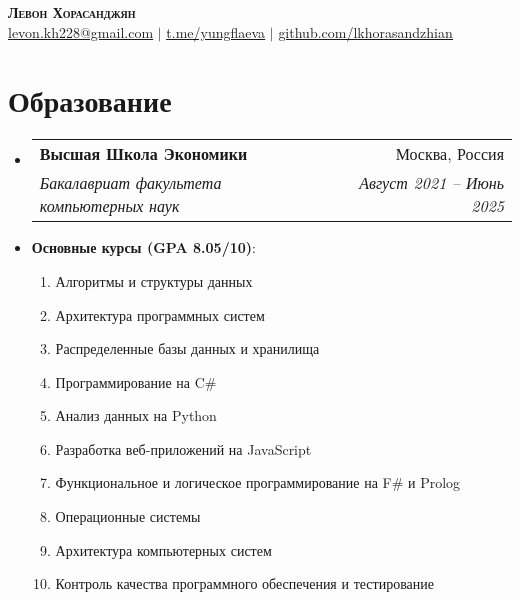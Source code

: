\documentclass[letterpaper,11pt]{article}
\makeatletter
\newcommand{\resumeItem}[1]{
  \item\small{
    {#1 \vspace{-4pt}}
  }
}
\newcommand{\resumeSubheading}[4]{
  \vspace{-2pt}\item
    \begin{tabular*}{0.97\textwidth}[t]{l@{\extracolsep{\fill}}r}
      \textbf{#1} & #2 \\
      \textit{\small#3} & \textit{\small #4} \\
    \end{tabular*}\vspace{-7pt}
}
\newcommand{\resumeSubHeadingListStart}{\begin{itemize}[leftmargin=0.15in, label={}]}
\newcommand{\resumeSubHeadingListEnd}{\end{itemize}}
\makeatother
\begin{document}

\begin{center}
    \textbf{\Huge \scshape Левон Хорасанджян} \\ \vspace{1pt}
    \href{mailto:levon.kh228@gmail.com}{\underline{levon.kh228@gmail.com}} $|$ 
    \href{https://t.me/yungflaeva}{\underline{t.me/yungflaeva}} $|$
    \href{https://github.com/lkhorasandzhian}{\underline{github.com/lkhorasandzhian}}
\end{center}


\section{Образование}
  \resumeSubHeadingListStart
    \resumeSubheading
      {Высшая Школа Экономики}{Москва, Россия}
      {Бакалавриат факультета компьютерных наук}{Август 2021 -- Июнь 2025}
      \resumeItem
    {\textbf{Основные курсы (GPA 8.05/10)}:
    \begin{enumerate}
        \item Алгоритмы и структуры данных
        \item Архитектура программных систем
        \item Распределенные базы данных и хранилища
        \item Программирование на C\#
        \item Анализ данных на Python
        \item Разработка веб-приложений на JavaScript
        \item Функциональное и логическое программирование на F\# и Prolog
        \item Операционные системы
        \item Архитектура компьютерных систем
        \item Контроль качества программного обеспечения и тестирование
    \end{enumerate}
    }
  \resumeSubHeadingListEnd
\end{document}
